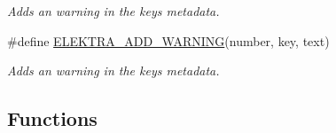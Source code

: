 \begin{DoxyCompactItemize}
\begin{DoxyCompactList}\small\item\em Adds an warning in the keys metadata. \end{DoxyCompactList}\item 
\#define \hyperlink{group__plugin_ga3da3bdb0f41710adda9eee3d7adac9ff}{E\-L\-E\-K\-T\-R\-A\-\_\-\-A\-D\-D\-\_\-\-W\-A\-R\-N\-I\-N\-G}(number, key, text)
\begin{DoxyCompactList}\small\item\em Adds an warning in the keys metadata. \end{DoxyCompactList}\end{DoxyCompactItemize}
\subsection*{Functions}
